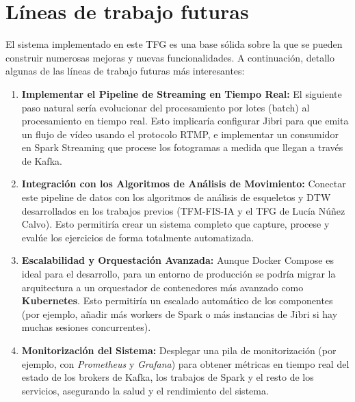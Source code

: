 \section{Líneas de trabajo futuras}

El sistema implementado en este TFG es una base sólida sobre la que se pueden construir numerosas mejoras y nuevas funcionalidades. A continuación, detallo algunas de las líneas de trabajo futuras más interesantes:

\begin{enumerate}
    \item \textbf{Implementar el Pipeline de Streaming en Tiempo Real:} El siguiente paso natural sería evolucionar del procesamiento por lotes (batch) al procesamiento en tiempo real. Esto implicaría configurar Jibri para que emita un flujo de vídeo usando el protocolo RTMP, e implementar un consumidor en Spark Streaming que procese los fotogramas a medida que llegan a través de Kafka.
    
    \item \textbf{Integración con los Algoritmos de Análisis de Movimiento:} Conectar este pipeline de datos con los algoritmos de análisis de esqueletos y DTW desarrollados en los trabajos previos (TFM-FIS-IA y el TFG de Lucía Núñez Calvo). Esto permitiría crear un sistema completo que capture, procese y evalúe los ejercicios de forma totalmente automatizada.
    
    \item \textbf{Escalabilidad y Orquestación Avanzada:} Aunque Docker Compose es ideal para el desarrollo, para un entorno de producción se podría migrar la arquitectura a un orquestador de contenedores más avanzado como \textbf{Kubernetes}. Esto permitiría un escalado automático de los componentes (por ejemplo, añadir más workers de Spark o más instancias de Jibri si hay muchas sesiones concurrentes).
    
    \item \textbf{Monitorización del Sistema:} Desplegar una pila de monitorización (por ejemplo, con \textit{Prometheus} y \textit{Grafana}) para obtener métricas en tiempo real del estado de los brokers de Kafka, los trabajos de Spark y el resto de los servicios, asegurando la salud y el rendimiento del sistema.
\end{enumerate}
